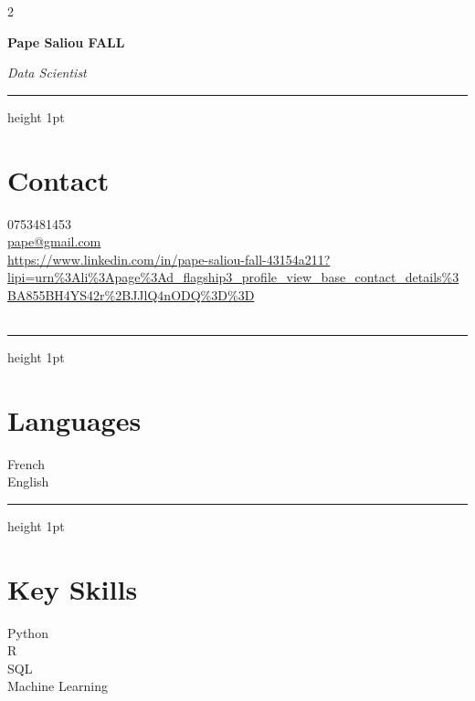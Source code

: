 \documentclass[10pt,letterpaper]{article}
\newcommand{\cvName}[1]{\vspace*{0.3in}\textbf{\LARGE #1}}
\newcommand{\cvHeadline}[1]{\par\smallskip\textit{#1}}
\newcommand{\cvHr}{\vspace{0.5\baselineskip}\hrule height 1pt\color{primary}\vspace{0.7\baselineskip}}
\begin{document}
\small
\begin{paracol}{2}

\begin{leftcolumn}
\begin{center}
\end{center}

\vspace{0.6in}

\cvName{Pape Saliou FALL}
\cvHeadline{Data Scientist}
\cvHr

\section*{Contact}
0753481453\\
\href{mailto:pape@gmail.com}{pape@gmail.com}\\
\url{https://www.linkedin.com/in/pape-saliou-fall-43154a211?lipi=urn%3Ali%3Apage%3Ad\_flagship3\_profile\_view\_base\_contact\_details%3BA855BH4YS42r%2BJJlQ4nODQ%3D%3D}\\
\\

\cvHr
\section*{Languages}
French\\
English

\cvHr
\section*{Key Skills}
Python\\
R\\
SQL\\
Machine Learning
\end{leftcolumn}

\begin{rightcolumn}

\end{rightcolumn}
\end{paracol}
\end{document}
